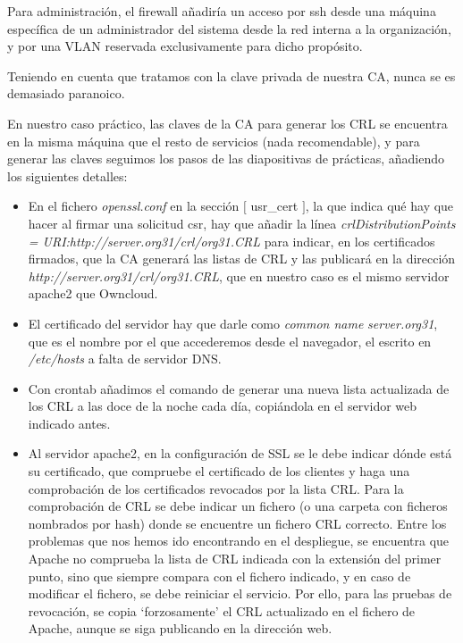 \documentclass[]{article}
\begin{document}
Para administración, el firewall añadiría un acceso por ssh desde una máquina específica de un administrador del sistema desde la red interna a la organización, y por una VLAN reservada exclusivamente para dicho propósito.

Teniendo en cuenta que tratamos con la clave privada de nuestra CA, nunca se es demasiado paranoico.


\hfill


En nuestro caso práctico, las claves de la CA para generar los CRL se encuentra en la misma máquina que el resto de servicios (nada recomendable), y para generar las claves seguimos los pasos de las diapositivas de prácticas, añadiendo los siguientes detalles:

\begin{itemize}
	\item En el fichero \textit{openssl.conf} en la sección $[$ usr\_cert $]$, la que indica qué hay que hacer al firmar una solicitud csr, hay que añadir la línea \textit{crlDistributionPoints = URI:http://server.org31/crl/org31.CRL} para indicar, en los certificados firmados, que la CA generará las listas de CRL y las publicará en la dirección \textit{http://server.org31/crl/org31.CRL}, que en nuestro caso es el mismo servidor apache2 que Owncloud.
	\item El certificado del servidor hay que darle como \textit{common name} \textit{server.org31}, que es el nombre por el que accederemos desde el navegador, el escrito en \textit{/etc/hosts} a falta de servidor DNS.
	\item Con crontab añadimos el comando de generar una nueva lista actualizada de los CRL a las doce de la noche cada día, copiándola en el servidor web indicado antes.
	\item Al servidor apache2, en la configuración de SSL se le debe indicar dónde está su certificado, que compruebe el certificado de los clientes y haga una comprobación de los certificados revocados por la lista CRL.
	\subitem Para la comprobación de CRL se debe indicar un fichero (o una carpeta con ficheros nombrados por hash) donde se encuentre un fichero CRL correcto.
	\subitem Entre los problemas que nos hemos ido encontrando en el despliegue, se encuentra que Apache no comprueba la lista de CRL indicada con la extensión del primer punto, sino que siempre compara con el fichero indicado, y en caso de modificar el fichero, se debe reiniciar el servicio. Por ello, para las pruebas de revocación, se copia `forzosamente' el CRL actualizado en el fichero de Apache, aunque se siga publicando en la dirección web.
\end{itemize}
\end{document}
